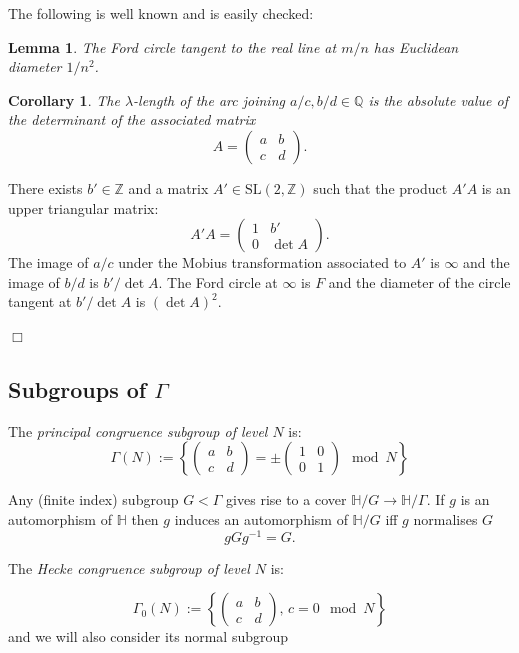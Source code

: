 \documentclass[12pt,a4paper]{amsart}
\newtheorem{coro}[thm]{Corollary}
\newtheorem{lem}[thm]{Lemma}
\def\ZZ{\mathbb{Z}}
\def\sl2{\mathrm{SL}(2, \ZZ)}
\begin{document}
The following is well known and is easily checked:

\begin{lem}\label{ford}
The Ford circle tangent to the real line at $m/n$
has Euclidean diameter $1/n^2$.
\end{lem}

\begin{coro}
	The $\lambda$-length of the arc joining 
	$a/c, b/d \in \mathbb{Q}$ is the absolute value of
	the determinant of the associated matrix 
	$$A= \begin{pmatrix} a& b\\c&d \end{pmatrix}.$$
\end{coro}

\proof There exists  $b'\in \mathbb{Z}$ and  a matrix $A' \in \sl2$ such that the product $A'A$
is an upper triangular matrix:
	$$A'A= \begin{pmatrix} 1& b'\\0& \det A
	\end{pmatrix}.$$
The image of $a/c$ under the Mobius transformation associated to
$A'$ is $\infty$ and the image of $b/d$ is $b'/\det A$.
The Ford circle at $\infty$ is $F$ and the 
diameter of the circle tangent at $b'/\det A$ is $(\det A)^2$.

\hfill $\Box$

\subsection{Subgroups of $\Gamma$}


The \textit{principal congruence subgroup of level $N$} is:
$$ \Gamma(N) := \left \{ \begin{pmatrix} a & b \\ c & d \end{pmatrix} = 
\pm \begin{pmatrix} 1 & 0 \\ 0 & 1 \end{pmatrix} \mod N \right \} 
$$

Any (finite index) subgroup $G < \Gamma$
gives rise to a cover
$\mathbb{H}/G\rightarrow \mathbb{H}/\Gamma$.
If $g$ is an automorphism of $\mathbb{H}$
then $g$ induces an automorphism of $\mathbb{H}/G$
iff $g$ normalises $G$ 
$$gGg^{-1} = G.$$


The \textit{Hecke congruence subgroup of level $N$} is:


$$ \Gamma_0(N) := \left \{ \begin{pmatrix} a & b \\ c & d
\end{pmatrix},\, c = 0 \mod N \right \}
$$
and we will also consider its normal subgroup
\end{document}
